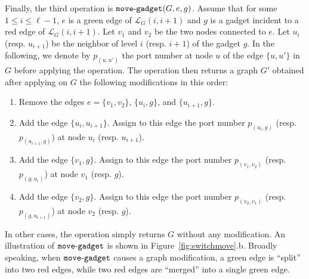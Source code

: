 \documentclass[11pt]{article}
\begin{document}
  Finally, the third operation is ${\tt
    move\mbox{-}gadget}(G,e,g)$. Assume that for some $1\leq i\leq \ell-1$, $e$ is a green edge of
  $\mathcal{L}_G(i,i+1)$ and $g$ is a gadget incident to a red edge of $\mathcal{L}_G(i,i+1)$. Let $v_1$ and $v_2$ be the two nodes connected to $e$.
  Let $u_i$ (resp. $u_{i+1}$) be the neighbor of level $i$ (resp. $i+1$)
  of the gadget $g$. In the following, we denote by $p_{(u,u')}$ the
  port number at node $u$ of the edge $\{u,u'\}$ in $G$ before applying
  the operation. 
%
The operation then returns a graph $G'$ obtained after applying on
  $G$ the following modifications in this order:
  \begin{enumerate}
  \item Remove the edges $e=\{v_1,v_2\}$, $\{u_i,g\}$, and $\{u_{i+1},g\}$.

  \item Add the edge $\{u_i,u_{i+1}\}$. Assign to this edge the port number $p_{(u_i,g)}$ (resp.  $p_{(u_{i+1},g)}$) at node $u_i$ (resp.
    $u_{i+1}$).

    \item Add the edge $\{v_1,g\}$. Assign to this edge the port number
      $p_{(v_1,v_2)}$ (resp. $p_{(g,u_i)}$) at node $v_1$ (resp. $g$).
      
    \item Add the edge $\{v_2,g\}$. Assign to this edge
      the port number $p_{(v_2,v_1)}$ (resp. $p_{(g,u_{i+1})}$) at node $v_2$ (resp. $g$).
  \end{enumerate}
  
In other cases, the operation simply returns $G$ without any modification. An illustration of ${\tt move\mbox{-}gadget}$ is shown in Figure~\ref{fig:switchmove}.b. Broadly speaking, when ${\tt move\mbox{-}gadget}$ causes a graph modification, a green edge is ``split'' into two red edges, while two red edges are ``merged'' into a single green edge.
\end{document}
